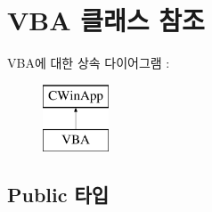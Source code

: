 \hypertarget{class_v_b_a}{}\section{V\+BA 클래스 참조}
\label{class_v_b_a}
V\+B\+A에 대한 상속 다이어그램 \+: \begin{figure}[H]
\begin{center}
\leavevmode
\includegraphics[height=2.000000cm]{class_v_b_a}
\end{center}
\end{figure}
\subsection*{Public 타입}
